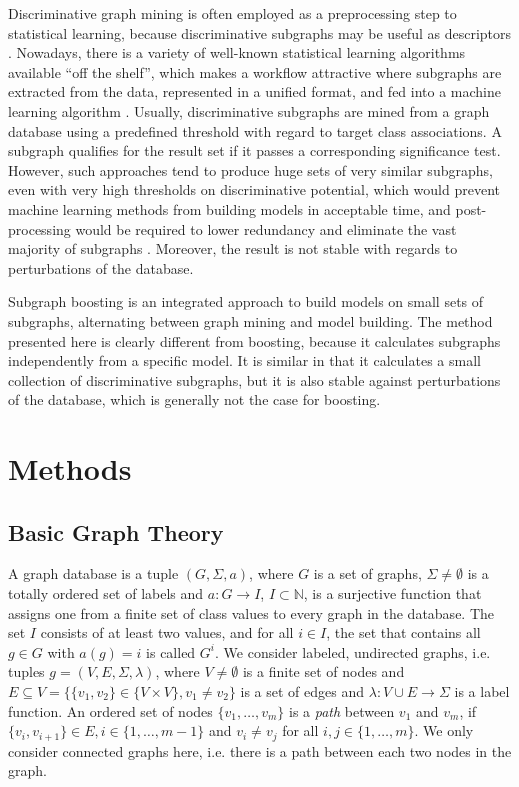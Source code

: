 \documentclass{sig-alternate}
\begin{document}
Discriminative graph mining is often employed as a preprocessing step to
statistical learning, because discriminative subgraphs may be useful as descriptors
\cite{bringmann10lego}. Nowadays, there is a variety of well-known statistical
learning algorithms available ``off the shelf'', which makes a workflow
attractive where subgraphs are extracted from the data, represented in a
unified format, and fed into a machine learning algorithm \cite{KRH01}.
Usually, discriminative subgraphs are mined from a graph database using a
predefined threshold with regard to target class associations. A subgraph
qualifies for the result set if it passes a corresponding significance test.
However, such approaches tend to produce huge sets of very similar subgraphs,
even with very high thresholds on discriminative potential, which would prevent
machine learning methods from building models in acceptable time, and post-processing 
would be required to lower redundancy and eliminate the vast
majority of subgraphs \cite{Hasan_origami:mining,Jun04Spin}. Moreover, the
result is not stable with regards to perturbations of the database.

Subgraph boosting \cite{saigo09gboost} is an integrated approach to build models on
small sets of subgraphs, alternating between graph mining and model building. The method presented here is clearly
different from boosting, because it calculates subgraphs independently from a specific model. It is similar in that it calculates a small
collection of discriminative subgraphs, but it is also stable against
perturbations of the database, which is generally not the case for boosting.


\section{Methods}
\label{s:Methods}

\subsection{Basic Graph Theory}
\label{ss:BasicGraphTheory}
A graph database is a tuple $(G, \Sigma, a)$, where $G$ is a set of graphs,
$\Sigma \ne \emptyset$  is a totally ordered set of labels and $a: G
\rightarrow I$, $I \subset \mathbb{N}$, is a surjective function that assigns one from a
finite set of class values to every graph in the database. The set 
$I$ consists of at least two values, and for all $i \in I$, the set that contains all $g \in G$
with $a(g)=i$ is called $G^i$. We consider labeled, undirected
graphs, i.e. tuples $g=(V,E,\Sigma,\lambda)$, where $V\ne \emptyset$ is a
finite set of nodes and $E \subseteq V = \{\{v_1, v_2\} \in \{V \times V\}, v_1
\ne v_2\}$ is a set of edges and $\lambda: V\cup E \rightarrow \Sigma$ is a
label function. 
An ordered set of nodes $\{ v_1, \ldots, v_m\}$ is a \emph{path} between $v_1$ and $v_m$, if $\{v_i, v_{i+1}\} \in E, i \in \{1,\ldots,m-1\}$ and $v_i \neq v_j$ for all $i,j\in \{1,\ldots,m\}$.
We only consider connected graphs here, i.e. there is a path
between each two nodes in the graph.
\end{document}
